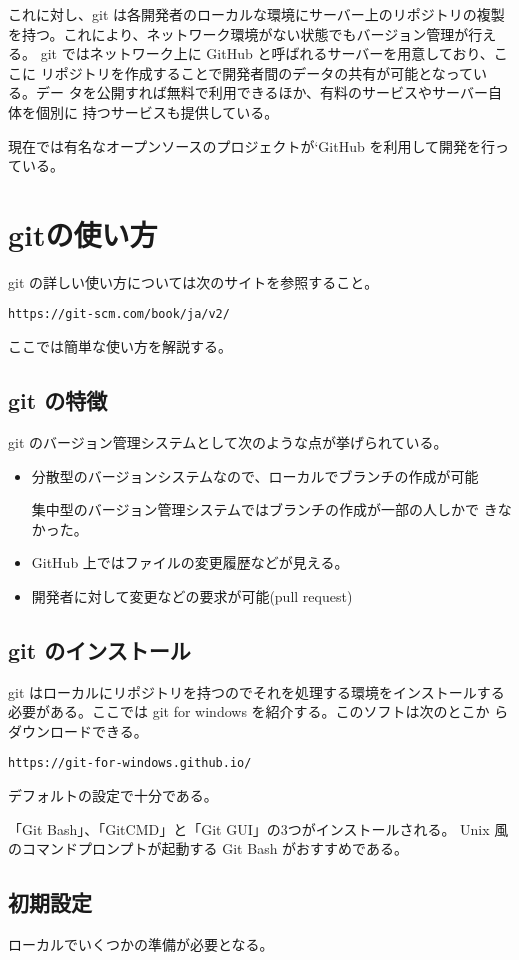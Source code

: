 これに対し、git は各開発者のローカルな環境にサーバー上のリポジトリの複製
を持つ。これにより、ネットワーク環境がない状態でもバージョン管理が行える。
git ではネットワーク上に GitHub と呼ばれるサーバーを用意しており、ここに
リポジトリを作成することで開発者間のデータの共有が可能となっている。デー
タを公開すれば無料で利用できるほか、有料のサービスやサーバー自体を個別に
持つサービスも提供している。

現在では有名なオープンソースのプロジェクトが`GitHub を利用して開発を行っ
ている。
\section{gitの使い方}
git の詳しい使い方については次のサイトを参照すること。

\Verb+https://git-scm.com/book/ja/v2/+

ここでは簡単な使い方を解説する。

\subsection{git の特徴}
git のバージョン管理システムとして次のような点が挙げられている。
\begin{itemize}
 \item 分散型のバージョンシステムなので、ローカルでブランチの作成が可能

       集中型のバージョン管理システムではブランチの作成が一部の人しかで
       きなかった。
 \item GitHub 上ではファイルの変更履歴などが見える。
 \item 開発者に対して変更などの要求が可能(pull request)
\end{itemize}

\subsection{git のインストール}
git はローカルにリポジトリを持つのでそれを処理する環境をインストールする
必要がある。ここでは git for windows を紹介する。このソフトは次のとこか
らダウンロードできる。

\Verb+https://git-for-windows.github.io/+

デフォルトの設定で十分である。

「Git Bash」、「GitCMD」と「Git GUI」の3つがインストールされる。
Unix 風のコマンドプロンプトが起動する Git Bash がおすすめである。

\subsection{初期設定}
ローカルでいくつかの準備が必要となる。

